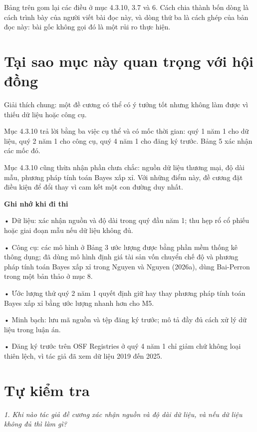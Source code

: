 Bảng trên gom lại các điều ở mục 4.3.10, 3.7 và 6. Cách chia thành bốn dòng là cách trình bày của người viết bài đọc này, và dòng thứ ba là cách ghép của bản đọc này: bài gốc không gọi đó là một rủi ro thực hiện.

\section{Tại sao mục này quan trọng với hội đồng}

Giải thích chung: một đề cương có thể có ý tưởng tốt nhưng không làm được vì thiếu dữ liệu hoặc công cụ.

Mục 4.3.10 trả lời bằng ba việc cụ thể và có mốc thời gian: quý 1 năm 1 cho dữ liệu, quý 2 năm 1 cho công cụ, quý 4 năm 1 cho đăng ký trước. Bảng 5 xác nhận các mốc đó.

Mục 4.3.10 cũng thừa nhận phần chưa chắc: nguồn dữ liệu thương mại, độ dài mẫu, phương pháp tính toán Bayes xấp xỉ. Với những điểm này, đề cương đặt điều kiện để đổi thay vì cam kết một con đường duy nhất.

\begin{tcolorbox}[breakable]
\textbf{Ghi nhớ khi đi thi}

• Dữ liệu: xác nhận nguồn và độ dài trong quý đầu năm 1; thu hẹp rổ cổ phiếu hoặc giai đoạn mẫu nếu dữ liệu không đủ.

• Công cụ: các mô hình ở Bảng 3 ước lượng được bằng phần mềm thống kê thông dụng; đã dùng mô hình định giá tài sản vốn chuyển chế độ và phương pháp tính toán Bayes xấp xỉ trong Nguyen và Nguyen (2026a), dùng Bai-Perron trong một bản thảo ở mục 8.

• Ước lượng thử quý 2 năm 1 quyết định giữ hay thay phương pháp tính toán Bayes xấp xỉ bằng ước lượng nhanh hơn cho M5.

• Minh bạch: lưu mã nguồn và tệp đăng ký trước; mô tả đầy đủ cách xử lý dữ liệu trong luận án.

• Đăng ký trước trên OSF Registries ở quý 4 năm 1 chỉ giảm chứ không loại thiên lệch, vì tác giả đã xem dữ liệu 2019 đến 2025.
\end{tcolorbox}

\section{Tự kiểm tra}

{\itshape 1. Khi nào tác giả đề cương xác nhận nguồn và độ dài dữ liệu, và nếu dữ liệu không đủ thì làm gì?\par}

